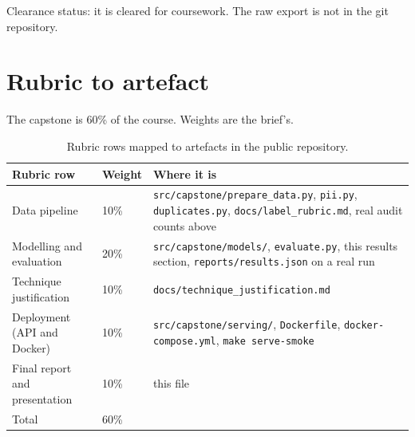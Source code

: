 \documentclass[11pt,a4paper]{article}
\begin{document}
Clearance status: it is cleared for coursework. The raw export is not in the git repository.

\section{Rubric to artefact}

The capstone is 60\% of the course. Weights are the brief's.

\begin{table}[H]
\centering
\caption{Rubric rows mapped to artefacts in the public repository.}
\begin{tabular}{ll>{\raggedright\arraybackslash}p{8.0cm}}
\toprule
Rubric row & Weight & Where it is \\
\midrule
Data pipeline & 10\% & \texttt{src/\allowbreak{}capstone/\allowbreak{}prepare\_\allowbreak{}data.py}, \texttt{pii.py}, \texttt{duplicates.py}, \texttt{docs/\allowbreak{}label\_\allowbreak{}rubric.md}, real audit counts above \\
Modelling and evaluation & 20\% & \texttt{src/\allowbreak{}capstone/\allowbreak{}models/\allowbreak{}}, \texttt{evaluate.py}, this results section, \texttt{reports/\allowbreak{}results.json} on a real run \\
Technique justification & 10\% & \texttt{docs/\allowbreak{}technique\_\allowbreak{}justification.md} \\
Deployment (API and Docker) & 10\% & \texttt{src/\allowbreak{}capstone/\allowbreak{}serving/\allowbreak{}}, \texttt{Dockerfile}, \texttt{docker-compose.yml}, \texttt{make serve-smoke} \\
Final report and presentation & 10\% & this file \\
Total & 60\% & \\
\bottomrule
\end{tabular}
\end{table}
\end{document}
